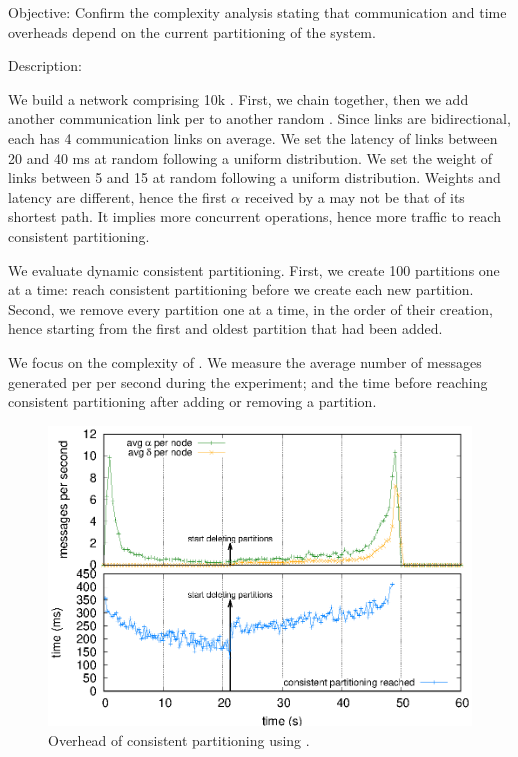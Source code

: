 \begin{asparadesc}
\item [Objective:] Confirm the complexity analysis stating that
  communication and time overheads depend on the current partitioning
  of the system.
  
\item [Description:]

We build a network comprising 10k \processes. First, we chain
\processes together, then we add another communication link per
\process to another random \process. Since links are bidirectional,
each \process has 4 communication links on average. We set the latency
of links between 20 and 40 ms at random following a uniform
distribution. We set the weight of links between 5 and 15 at random
following a uniform distribution. Weights and latency are different,
hence the first $\alpha$ received by a \process may not be that of its
shortest path. It implies more concurrent operations, hence more
traffic to reach consistent partitioning.

\noindent We evaluate dynamic consistent partitioning. First, we
create 100 partitions one at a time: \processes reach consistent
partitioning before we create each new partition. Second, we remove
every partition one at a time, in the order of their creation, hence
starting from the first and oldest partition that had been added.

\noindent We focus on the complexity of \NAME. We measure the average
number of messages generated per \process per second during the
experiment; and the time before reaching consistent partitioning after
adding or removing a partition.

\begin{figure}
  \centering\includegraphics[width=0.61\columnwidth]{img/as_cast_complexity.eps}
  \caption{\label{fig:complexity}Overhead of consistent partitioning
    using \NAME.}
  
\end{figure}


\end{asparadesc}
